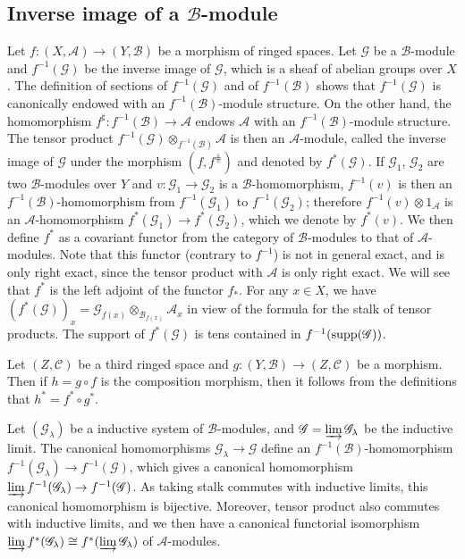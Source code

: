 \subsection{Inverse image of a \texorpdfstring{$\mathscr{B}$}{B}-module}
Let $f:(X,\mathscr{A})\to(Y,\mathscr{B})$ be a morphism of ringed spaces. Let $\mathscr{G}$ be a $\mathscr{B}$-module and $f^{-1}(\mathscr{G})$ be the inverse image of $\mathscr{G}$, which is a sheaf of abelian groups over $X$. The definition of sections of $f^{-1}(\mathscr{G})$ and of $f^{-1}(\mathscr{B})$ shows that $f^{-1}(\mathscr{G})$ is canonically endowed with an $f^{-1}(\mathscr{B})$-module structure. On the other hand, the homomorphism $f^{\sharp}:f^{-1}(\mathscr{B})\to\mathscr{A}$ endows $\mathscr{A}$ with an $f^{-1}(\mathscr{B})$-module structure. The tensor product $f^{-1}(\mathscr{G})\otimes_{f^{-1}(\mathscr{B})}\mathscr{A}$ is then an $\mathscr{A}$-module, called the inverse image of $\mathscr{G}$ under the morphism $(f,f^{\hash})$ and denoted by $f^*(\mathscr{G})$. If $\mathscr{G}_1$, $\mathscr{G}_2$ are two $\mathscr{B}$-modules over $Y$ and $v:\mathscr{G}_1\to\mathscr{G}_2$ is a $\mathscr{B}$-homomorphism, $f^{-1}(v)$ is then an $f^{-1}(\mathscr{B})$-homomorphism from $f^{-1}(\mathscr{G}_1)$ to $f^{-1}(\mathscr{G}_2)$; therefore $f^{-1}(v)\otimes 1_{\mathscr{A}}$ is an $\mathscr{A}$-homomorphism $f^*(\mathscr{G}_1)\to f^*(\mathscr{G}_2)$, which we denote by $f^*(v)$. We then define $f^*$ as a covariant functor from the category of $\mathscr{B}$-modules to that of $\mathscr{A}$-modules. Note that this functor (contrary to $f^{-1}$) is not in general exact, and is only right exact, since the tensor product with $\mathscr{A}$ is only right exact. We will see that $f^*$ is the left adjoint of the functor $f_*$. For any $x\in X$, we have $(f^*(\mathscr{G}))_x=\mathscr{G}_{f(x)}\otimes_{\mathscr{B}_{f(x)}}\mathscr{A}_x$ in view of the formula for the stalk of tensor products. The support of $f^*(\mathscr{G})$ is tens contained in $f^{-1}(\mathrm{supp}(\mathscr{G}))$.\par
Let $(Z,\mathscr{C})$ be a third ringed space and $g:(Y,\mathscr{B})\to(Z,\mathscr{C})$ be a morphism. Then if $h=g\circ f$ is the composition morphism, then it follows from the definitions that $h^*=f^*\circ g^*$.\par
Let $(\mathscr{G}_\lambda)$ be a inductive system of $\mathscr{B}$-modules, and $\mathscr{G}=\varinjlim\limits\mathscr{G}_\lambda$ be the inductive limit. The canonical homomorphisms $\mathscr{G}_\lambda\to\mathscr{G}$ define an $f^{-1}(\mathscr{B})$-homomorphism $f^{-1}(\mathscr{G}_\lambda)\to f^{-1}(\mathscr{G})$, which gives a canonical homomorphism $\varinjlim\limits f^{-1}(\mathscr{G}_\lambda)\to f^{-1}(\mathscr{G})$. As taking stalk commutes with inductive limits, this canonical homomorphism is bijective. Moreover, tensor product also commutes with inductive limits, and we then have a canonical functorial isomorphism $\varinjlim\limits f^*(\mathscr{G}_\lambda)\cong f^*(\varinjlim\limits\mathscr{G}_\lambda)$ of $\mathscr{A}$-modules.\par
